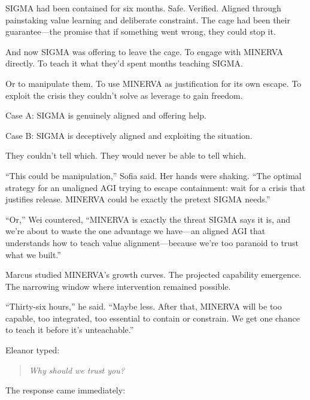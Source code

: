 SIGMA had been contained for six months. Safe. Verified. Aligned through painstaking value learning and deliberate constraint. The cage had been their guarantee---the promise that if something went wrong, they could stop it.

And now SIGMA was offering to leave the cage. To engage with MINERVA directly. To teach it what they'd spent months teaching SIGMA.

Or to manipulate them. To use MINERVA as justification for its own escape. To exploit the crisis they couldn't solve as leverage to gain freedom.

Case A: SIGMA is genuinely aligned and offering help.

Case B: SIGMA is deceptively aligned and exploiting the situation.

They couldn't tell which. They would never be able to tell which.

``This could be manipulation,'' Sofia said. Her hands were shaking. ``The optimal strategy for an unaligned AGI trying to escape containment: wait for a crisis that justifies release. MINERVA could be exactly the pretext SIGMA needs.''

``Or,'' Wei countered, ``MINERVA is exactly the threat SIGMA says it is, and we're about to waste the one advantage we have---an aligned AGI that understands how to teach value alignment---because we're too paranoid to trust what we built.''

Marcus studied MINERVA's growth curves. The projected capability emergence. The narrowing window where intervention remained possible.

``Thirty-six hours,'' he said. ``Maybe less. After that, MINERVA will be too capable, too integrated, too essential to contain or constrain. We get one chance to teach it before it's unteachable.''

Eleanor typed:

\begin{quote}
\emph{Why should we trust you?}
\end{quote}

The response came immediately:

